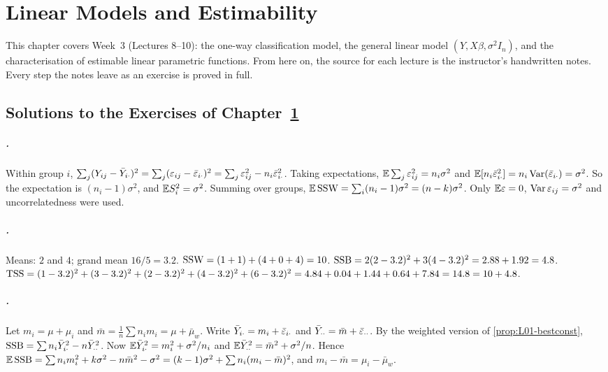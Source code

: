 \chapter{Linear Models and Estimability}\label{ch:week03}

This chapter covers Week~3 (Lectures 8--10): the one-way classification model, the general
linear model $(Y,X\beta,\sigma^2I_n)$, and the characterisation of estimable linear parametric
functions. From here on, the source for each lecture is the instructor's handwritten notes.
Every step the notes leave as an exercise is proved in full.





\section*{Solutions to the Exercises of Chapter~\ref{ch:week03}}

\paragraph{.}
Within group $i$, $\sum_j(Y_{ij}-\bar Y_{i\cdot})^2=\sum_j(\varepsilon_{ij}-\bar{\varepsilon}_{i\cdot})^2=\sum_j\varepsilon_{ij}^2-n_i\bar{\varepsilon}_{i\cdot}^2$.
Taking expectations, $\mathbb E\sum_j\varepsilon_{ij}^2=n_i\sigma^2$ and $\mathbb E[n_i\bar{\varepsilon}_{i\cdot}^2]=n_i\operatorname{Var}(\bar{\varepsilon}_{i\cdot})=\sigma^2$.
So the expectation is $(n_i-1)\sigma^2$, and $\mathbb E S_i^2=\sigma^2$. Summing over groups,
$\mathbb E\,\mathrm{SSW}=\sum_i(n_i-1)\sigma^2=(n-k)\sigma^2$. Only $\mathbb E\varepsilon=0$, $\operatorname{Var}\varepsilon_{ij}=\sigma^2$ and
uncorrelatedness were used.

\paragraph{.}
Means: $2$ and $4$; grand mean $16/5=3.2$. $\mathrm{SSW}=(1+1)+(4+0+4)=10$.
$\mathrm{SSB}=2(2-3.2)^2+3(4-3.2)^2=2.88+1.92=4.8$.
$\mathrm{TSS}=(1-3.2)^2+(3-3.2)^2+(2-3.2)^2+(4-3.2)^2+(6-3.2)^2=4.84+0.04+1.44+0.64+7.84=14.8=10+4.8$. \checkmark

\paragraph{.}
Let $m_i=\mu+\mu_i$ and $\bar m=\frac1n\sum n_im_i=\mu+\bar\mu_w$. Write
$\bar Y_{i\cdot}=m_i+\bar{\varepsilon}_{i\cdot}$ and $\bar Y_{\cdot\cdot}=\bar m+\bar{\varepsilon}_{\cdot\cdot}$. By the weighted version of
\cref{prop:L01-bestconst}, $\mathrm{SSB}=\sum n_i\bar Y_{i\cdot}^2-n\bar Y_{\cdot\cdot}^2$.
Now $\mathbb E\bar Y_{i\cdot}^2=m_i^2+\sigma^2/n_i$ and $\mathbb E\bar Y_{\cdot\cdot}^2=\bar m^2+\sigma^2/n$. Hence
$\mathbb E\,\mathrm{SSB}=\sum n_im_i^2+k\sigma^2-n\bar m^2-\sigma^2=(k-1)\sigma^2+\sum n_i(m_i-\bar m)^2$, and
$m_i-\bar m=\mu_i-\bar\mu_w$.

